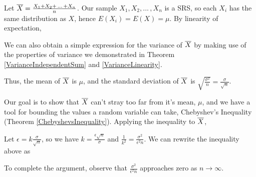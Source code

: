 \begin{pf} Let ${\overline{X}} = \frac{X_1+X_2+\,...\,+X_n}{n}$. Our sample $X_1, X_2, ... \,, X_n$ is a SRS, so each $X_i$ has the same distribution as $X$, hence $E(X_i) = E(X) = \mu$. By linearity of expectation,
\par
\noindent We can also obtain a simple expression for the variance of ${\overline{X}}$ by making use of the properties of variance we demonstrated in Theorem \ref{VarianceIndependentSum} and \ref{VarianceLinearity}.
\par
\noindent
Thus, the mean of ${\overline{X}}$ is $\mu$, and the standard deviation of ${\overline{X}}$ is $\sqrt{\frac{\sigma^2}{n}} = \frac{\sigma}{\sqrt{n}}$.
\par
\noindent Our goal is to show that ${\overline{X}}$ can't stray too far from it's mean, $\mu$, and we have a tool for bounding the values a random variable can take, Chebyshev's Inequality (Theorem \ref{ChebyshevsInequality}). Applying the inequality to ${\overline{X}}$,

\vspace{0.5em}
\par
\noindent Let $\epsilon = k\frac{\sigma}{\sqrt{n}}$, so we have $k = \frac{\epsilon\sqrt{n}}{\sigma}$ and $\frac{1}{k^2} = \frac{\sigma^2}{\epsilon^2n}$. We can rewrite the inequality above as
\par
\noindent To complete the argument, observe that $\frac{\sigma^2}{\epsilon^2n}$ approaches zero as $n \to \infty$.
\end{pf}
